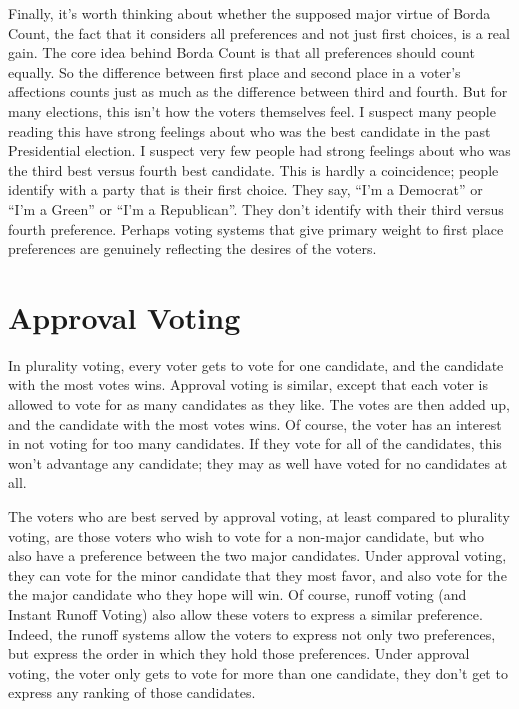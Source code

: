 Finally, it's worth thinking about whether the supposed major virtue of Borda Count, the fact that it considers all preferences and not just first choices, is a real gain. The core idea behind Borda Count is that all preferences should count equally. So the difference between first place and second place in a voter's affections counts just as much as the difference between third and fourth. But for many elections, this isn't how the voters themselves feel. I suspect many people reading this have strong feelings about who was the best candidate in the past Presidential election. I suspect very few people had strong feelings about who was the third best versus fourth best candidate. This is hardly a coincidence; people identify with a party that is their first choice. They say, ``I'm a Democrat'' or ``I'm a Green'' or ``I'm a Republican''. They don't identify with their third versus fourth preference. Perhaps voting systems that give primary weight to first place preferences are genuinely reflecting the desires of the voters. 

\section{Approval Voting}
In plurality voting, every voter gets to vote for one candidate, and the candidate with the most votes wins. Approval voting is similar, except that each voter is allowed to vote for as many candidates as they like. The votes are then added up, and the candidate with the most votes wins. Of course, the voter has an interest in not voting for too many candidates. If they vote for all of the candidates, this won't advantage any candidate; they may as well have voted for no candidates at all.

The voters who are best served by approval voting, at least compared to plurality voting, are those voters who wish to vote for a non-major candidate, but who also have a preference between the two major candidates. Under approval voting, they can vote for the minor candidate that they most favor, and also vote for the the major candidate who they hope will win. Of course, runoff voting (and Instant Runoff Voting) also allow these voters to express a similar preference. Indeed, the runoff systems allow the voters to express not only two preferences, but express the order in which they hold those preferences. Under approval voting, the voter only gets to vote for more than one candidate, they don't get to express any ranking of those candidates.

